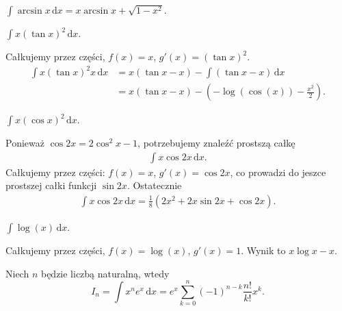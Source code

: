 \begin{integralsolved}
    $\int \arcsin x \,\mathrm{d} x = x \arcsin x + \sqrt{1-x^2}$.
\end{integralsolved}

\begin{integral}
    $\int x (\tan x)^2 \,\mathrm{d} x$.
\end{integral}

\begin{solution}
    Całkujemy przez części, $f(x) = x$, $g'(x) = (\tan x)^2$.
    \begin{align}
        \int x (\tan x)^2 x \, \mathrm{d} x & = x (\tan x - x) - \int (\tan x - x) \,\mathrm{d}x \\
        & = x (\tan x - x) - \left(-\log(\cos(x)) - \frac{x^2}{2}\right).
    \end{align}
\end{solution}

\begin{integral}
    $\int x (\cos x)^2 \,\mathrm{d} x$.
\end{integral}

\begin{solution}
    Ponieważ $\cos 2x = 2 \cos^2 x - 1$, potrzebujemy znaleźć prostszą całkę 
    \begin{align}
        \int x \cos 2x \, \mathrm{d} x.
    \end{align}
    Całkujemy przez części: $f(x) = x$, $g'(x) = \cos 2x$, co prowadzi do jeszce prostszej całki funkcji $\sin 2x$.
    Ostatecznie
    \begin{align}
        \int x \cos 2x \, \mathrm{d} x = \frac 1 8 \left(2x^2 + 2x \sin 2x + \cos 2x\right).
    \end{align}
\end{solution}

\begin{integral}
    $\int \log(x) \,\mathrm{d}x$.
\end{integral}

\begin{solution}
    Całkujemy przez części, $f(x) = \log(x)$, $g'(x) = 1$.
    Wynik to $x\log x - x$.
\end{solution}

\begin{integral}
    Niech $n$ będzie liczbą naturalną, wtedy
    \begin{equation}
        I_n = \int x^n e^x \,\mathrm{d} x = e^x \sum_{k=0}^n (-1)^{n-k} \frac{n!}{k!}x^k.
    \end{equation}
\end{integral}

